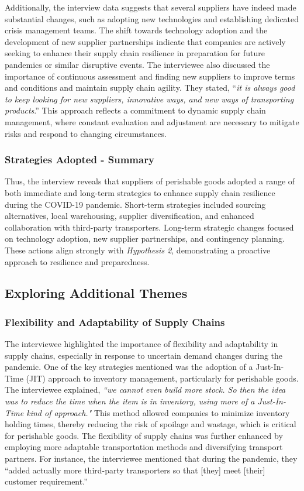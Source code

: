 Additionally, the interview data suggests that several suppliers have indeed made substantial changes, such as adopting new technologies and establishing dedicated crisis management teams. The shift towards technology adoption and the development of new supplier partnerships indicate that companies are actively seeking to enhance their supply chain resilience in preparation for future pandemics or similar disruptive events. The interviewee also discussed the importance of continuous assessment and finding new suppliers to improve terms and conditions and maintain supply chain agility. They stated, “\textit{it is always good to keep looking for new suppliers, innovative ways, and new ways of transporting products}.” This approach reflects a commitment to dynamic supply chain management, where constant evaluation and adjustment are necessary to mitigate risks and respond to changing circumstances.

\subsubsection{Strategies Adopted - Summary}

Thus, the interview reveals that suppliers of perishable goods adopted a range of both immediate and long-term strategies to enhance supply chain resilience during the COVID-19 pandemic. Short-term strategies included sourcing alternatives, local warehousing, supplier diversification, and enhanced collaboration with third-party transporters. Long-term strategic changes focused on technology adoption, new supplier partnerships, and contingency planning. These actions align strongly with \textit{Hypothesis 2}, demonstrating a proactive approach to resilience and preparedness.


\subsection{Exploring Additional Themes}

\subsubsection{Flexibility and Adaptability of Supply Chains}
The interviewee highlighted the importance of flexibility and adaptability in supply chains, especially in response to uncertain demand changes during the pandemic. One of the key strategies mentioned was the adoption of a Just-In-Time (JIT) approach to inventory management, particularly for perishable goods. The interviewee explained, \textit{“we cannot even build more stock. So then the idea was to reduce the time when the item is in inventory, using more of a Just-In-Time kind of approach."} This method allowed companies to minimize inventory holding times, thereby reducing the risk of spoilage and wastage, which is critical for perishable goods. The flexibility of supply chains was further enhanced by employing more adaptable transportation methods and diversifying transport partners. For instance, the interviewee mentioned that during the pandemic, they “added actually more third-party transporters so that [they] meet [their] customer requirement.” 

